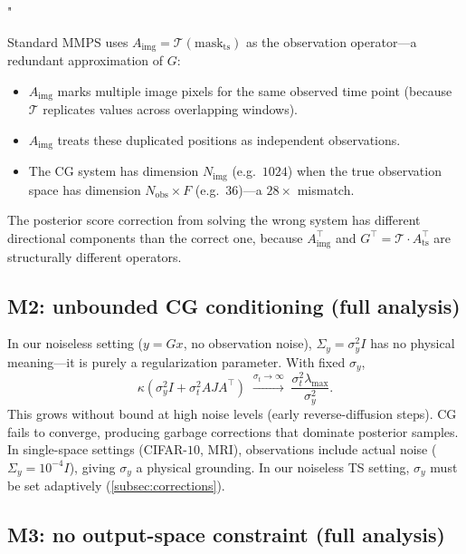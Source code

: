 "\documentclass{article}
\theoremstyle{plain}
\theoremstyle{definition}
\theoremstyle{remark}
\newcommand{\tsimg}{\mathcal{T}}
\newcommand{\Nimg}{N_{\mathrm{img}}}
\newcommand{\Nobs}{N_{\mathrm{obs}}}
\newcommand{\Ats}{A_{\mathrm{ts}}}
\newcommand{\Aimg}{A_{\mathrm{img}}}
\begin{document}
Standard MMPS uses $\Aimg = \tsimg(\mathrm{mask}_{\mathrm{ts}})$ as the observation operator---a redundant approximation of $G$:
\begin{itemize}
\setlength{\itemsep}{0pt}
\item $\Aimg$ marks multiple image pixels for the same observed time point (because $\tsimg$ replicates values across overlapping windows).
\item $\Aimg$ treats these duplicated positions as independent observations.
\item The CG system has dimension $\Nimg$ (e.g.\ $1024$) when the true observation space has dimension $\Nobs \times F$ (e.g.\ $36$)---a $28\times$ mismatch.
\end{itemize}
The posterior score correction from solving the wrong system has different directional components than the correct one, because $\Aimg^\top$ and $G^\top = \tsimg \cdot \Ats^\top$ are structurally different operators.

\subsection{M2: unbounded CG conditioning (full analysis)}
\label{app:M2}

In our noiseless setting ($y = Gx$, no observation noise), $\Sigma_y = \sigma_y^2 I$ has no physical meaning---it is purely a regularization parameter. With fixed $\sigma_y$,
$$
\kappa(\sigma_y^2 I + \sigma_t^2 A J A^\top) \;\xrightarrow{\sigma_t \to \infty}\; \frac{\sigma_t^2 \lambda_{\max}}{\sigma_y^2}.
$$
This grows without bound at high noise levels (early reverse-diffusion steps). CG fails to converge, producing garbage corrections that dominate posterior samples. In single-space settings (CIFAR-$10$, MRI), observations include actual noise ($\Sigma_y = 10^{-4} I$), giving $\sigma_y$ a physical grounding. In our noiseless TS setting, $\sigma_y$ must be set adaptively (\cref{subsec:corrections}).

\subsection{M3: no output-space constraint (full analysis)}
\label{app:M3}
\end{document}
